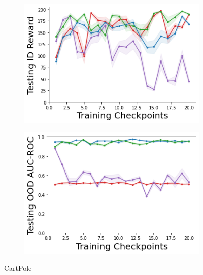 \begin{figure}
    \begin{subfigure}{.4\textwidth}
        \includegraphics[width=\textwidth]{sections/011_icml2022/resources/CartPole-v0-mean_reward_-testing-model.png}  
    \end{subfigure}
    \begin{subfigure}{.4\textwidth}
        \includegraphics[width=\textwidth]{sections/011_icml2022/resources/CartPoleOOD-v0-AUC-ROC-epistemic_-testing-model.png}
    \end{subfigure}
        \vspace{-3mm}
    \caption*{CartPole}
    \vspace{2mm}


\end{figure}
